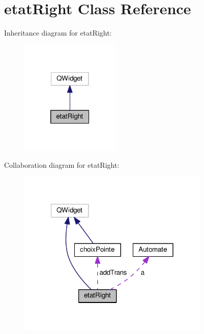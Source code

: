 \hypertarget{classetat_right}{\section{etat\-Right Class Reference}
\label{classetat_right}
}


Inheritance diagram for etat\-Right\-:
\nopagebreak
\begin{figure}[H]
\begin{center}
\leavevmode
\includegraphics[width=134pt]{classetat_right__inherit__graph}
\end{center}
\end{figure}


Collaboration diagram for etat\-Right\-:
\nopagebreak
\begin{figure}[H]
\begin{center}
\leavevmode
\includegraphics[width=259pt]{classetat_right__coll__graph}
\end{center}
\end{figure}
